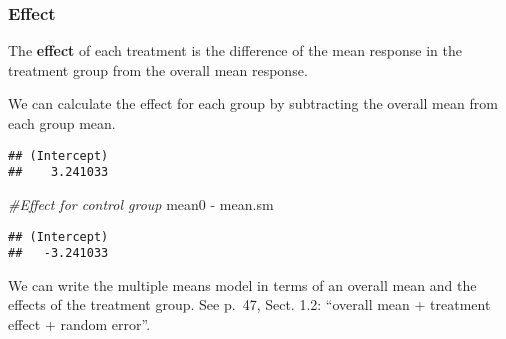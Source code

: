 \documentclass[
]{article}
\newenvironment{Shaded}{\begin{snugshade}}{\end{snugshade}}
\newcommand{\CommentTok}[1]{\textcolor[rgb]{0.56,0.35,0.01}{\textit{#1}}}
\newcommand{\FunctionTok}[1]{\textcolor[rgb]{0.00,0.00,0.00}{#1}}
\newcommand{\NormalTok}[1]{#1}
\newcommand{\OtherTok}[1]{\textcolor[rgb]{0.56,0.35,0.01}{#1}}
\newcommand{\SpecialCharTok}[1]{\textcolor[rgb]{0.00,0.00,0.00}{#1}}
\newcommand{\StringTok}[1]{\textcolor[rgb]{0.31,0.60,0.02}{#1}}
\begin{document}
\hypertarget{effect}{%
\subsubsection{Effect}\label{effect}}

The \textbf{effect} of each treatment is the difference of the mean
response in the treatment group from the overall mean response.

We can calculate the effect for each group by subtracting the overall
mean from each group mean.

\begin{Shaded}
\end{Shaded}

\begin{verbatim}
## (Intercept) 
##    3.241033
\end{verbatim}

\begin{Shaded}
\begin{Highlighting}[]
\CommentTok{\#Effect for control group}
\NormalTok{mean0 }\SpecialCharTok{{-}}\NormalTok{ mean.sm}
\end{Highlighting}
\end{Shaded}

\begin{verbatim}
## (Intercept) 
##   -3.241033
\end{verbatim}

We can write the multiple means model in terms of an overall mean and
the effects of the treatment group. See p.~47, Sect. 1.2: ``overall mean
+ treatment effect + random error''.
\end{document}
